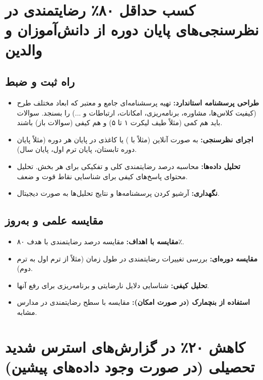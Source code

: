 \documentclass[12pt,a4paper]{article}
\begin{document}
\section{کسب حداقل ۸۰٪ رضایتمندی در نظرسنجی‌های پایان دوره از دانش‌آموزان و والدین}

\subsection*{راه ثبت و ضبط}
\begin{itemize}
    \item \textbf{طراحی پرسشنامه استاندارد:} تهیه پرسشنامه‌ای جامع و معتبر که ابعاد مختلف طرح (کیفیت کلاس‌ها، مشاوره، برنامه‌ریزی، امکانات، ارتباطات و ...) را بسنجد. سوالات باید هم کمی (مثلاً طیف لیکرت ۱ تا ۵) و هم کیفی (سوالات باز) باشند.
    \item \textbf{اجرای نظرسنجی:} به صورت آنلاین (مثلاً با ) یا کاغذی در پایان هر دوره (مثلاً پایان دوره تابستان، پایان ترم اول، پایان سال).
    \item \textbf{تحلیل داده‌ها:} محاسبه درصد رضایتمندی کلی و تفکیکی برای هر بخش. تحلیل محتوای پاسخ‌های کیفی برای شناسایی نقاط قوت و ضعف.
    \item \textbf{نگهداری:} آرشیو کردن پرسشنامه‌ها و نتایج تحلیل‌ها به صورت دیجیتال.
\end{itemize}

\subsection*{مقایسه علمی و به‌روز}
\begin{itemize}
    \item \textbf{مقایسه با اهداف:} مقایسه درصد رضایتمندی با هدف ۸۰٪.
    \item \textbf{مقایسه دوره‌ای:} بررسی تغییرات رضایتمندی در طول زمان (مثلاً از ترم اول به ترم دوم).
    \item \textbf{تحلیل کیفی:} شناسایی دلایل نارضایتی و برنامه‌ریزی برای رفع آنها.
    \item \textbf{استفاده از بنچمارک (در صورت امکان):} مقایسه با سطح رضایتمندی در مدارس مشابه.
\end{itemize}

\section{کاهش ۲۰٪ در گزارش‌های استرس شدید تحصیلی (در صورت وجود داده‌های پیشین)}
\end{document}
